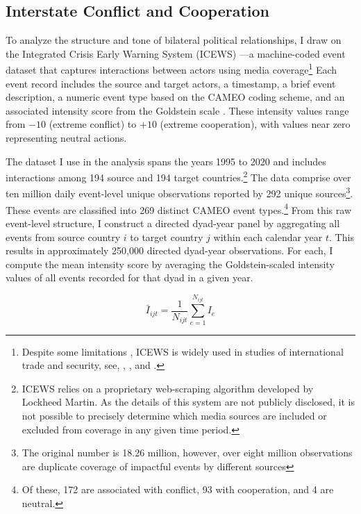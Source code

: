 \documentclass[12pt]{article}
\begin{document}
\subsection{Interstate Conflict and Cooperation}
To analyze the structure and tone of bilateral political relationships, I draw on the Integrated Crisis Early Warning System (ICEWS) \parencite{boschee2015icews}—a machine-coded event dataset that captures interactions between actors using media coverage\footnote{Despite some limitations \textcite{jager2018limits}, ICEWS is widely used in studies of international trade and security, see, \textcite{peterson2021sanctions}, \textcite{peterson2021conflict}, and \textcite{kinne2024network}.} Each event record includes the source and target actors, a timestamp, a brief event description, a numeric event type based on the CAMEO coding scheme, and an associated intensity score from the Goldstein scale \parencite{goldstein1992}. These intensity values range from $-10$ (extreme conflict) to $+10$ (extreme cooperation), with values near zero representing neutral actions. 

The dataset I use in the analysis spans the years 1995 to 2020 and includes interactions among 194 source and 194 target countries.\footnote{ICEWS relies on a proprietary web-scraping algorithm developed by Lockheed Martin. As the details of this system are not publicly disclosed, it is not possible to precisely determine which media sources are included or excluded from coverage in any given time period.} The data comprise over ten million daily event-level unique observations reported by 292 unique sources\footnote{The original number is 18.26 million, however, over eight million observations are duplicate coverage of impactful events by different sources}. These events are classified into 269 distinct CAMEO event types.\footnote{Of these, 172 are associated with conflict, 93 with cooperation, and 4 are neutral.} From this raw event-level structure, I construct a directed dyad-year panel by aggregating all events from source country $i$ to target country $j$ within each calendar year $t$. This results in approximately 250,000 directed dyad-year observations. For each, I compute the mean intensity score by averaging the Goldstein-scaled intensity values of all events recorded for that dyad in a given year.

\begin{equation}
\bar{I}_{ijt} = \frac{1}{N_{ijt}} \sum_{e=1}^{N_{ijt}} I_e
\end{equation}
\end{document}
